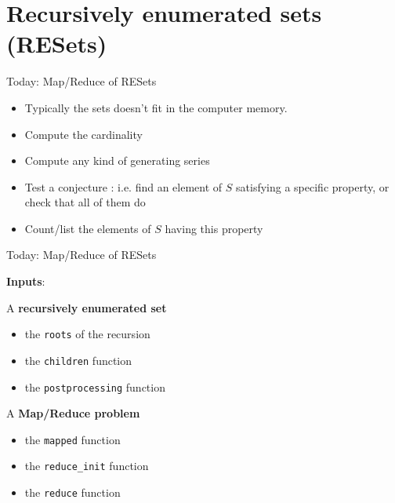\documentclass[compress,11pt]{beamer}
\begin{document}
\section{Recursively enumerated sets (RESets)}
\begin{frame}[fragile]{Today: Map/Reduce of RESets}

  \begin{center}
  \end{center}
  \bigskip\pause

  \begin{itemize}
  \item Typically the sets doesn't fit in the computer memory.
    \bigskip

  \item Compute the cardinality
  \item Compute any kind of generating series
  \item Test a conjecture : i.e. find an element of $S$ satisfying a specific
    property, or check that all of them do
  \item Count/list the elements of $S$ having this property
  \end{itemize}
\end{frame}

\begin{frame}[fragile]{Today: Map/Reduce of RESets}

  \textbf{Inputs}:
  \bigskip

  A \textbf{recursively enumerated set}
  \begin{itemize}
  \item the \texttt{roots} of the recursion
  \item the \texttt{children} function
  \item the \texttt{postprocessing} function
  \end{itemize}
  A \textbf{Map/Reduce problem}
  \begin{itemize}
  \item the \texttt{mapped} function
  \item the \verb|reduce_init| function
  \item the \texttt{reduce} function
  \end{itemize}
\end{frame}
\end{document}

